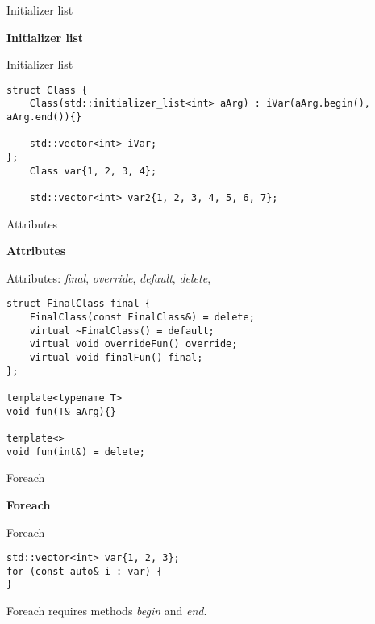 \documentclass{beamer}
\begin{document}
\begin{frame}[fragile]{Initializer list}
\begin{center}
{\Huge \textbf{Initializer list}}
\end{center}
\end{frame}

\begin{frame}[fragile]{Initializer list}
\begin{lstlisting}[style=customcpp]
struct Class {
	Class(std::initializer_list<int> aArg) : iVar(aArg.begin(), aArg.end()){}

	std::vector<int> iVar;
};
	Class var{1, 2, 3, 4};
  
	std::vector<int> var2{1, 2, 3, 4, 5, 6, 7};
\end{lstlisting}
\end{frame}

\begin{frame}[fragile]{Attributes}
\begin{center}
{\Huge \textbf{Attributes}}
\end{center}
\end{frame}

\begin{frame}[fragile]{Attributes: \textit{final}, \textit{override}, \textit{default}, \textit{delete}, }
\begin{lstlisting}[style=customcpp]
struct FinalClass final {
	FinalClass(const FinalClass&) = delete;
	virtual ~FinalClass() = default;
	virtual void overrideFun() override;
	virtual void finalFun() final;
};

template<typename T>
void fun(T& aArg){}

template<>
void fun(int&) = delete;
\end{lstlisting}
\end{frame}

\begin{frame}[fragile]{Foreach}
\begin{center}
{\Huge \textbf{Foreach}}
\end{center}
\end{frame}

\begin{frame}[fragile]{Foreach}
\begin{lstlisting}[style=customcpp]
std::vector<int> var{1, 2, 3};
for (const auto& i : var) {
}
\end{lstlisting}
Foreach requires methods \textit{begin} and \textit{end}.
\end{frame}
\end{document}
